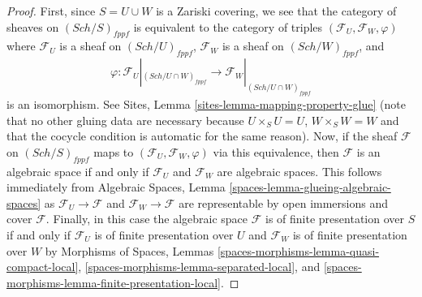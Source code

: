 \documentclass{stacks-project}
\theoremstyle{plain}
\theoremstyle{definition}
\theoremstyle{remark}
\numberwithin{equation}{subsection}
\def\Sch{\mathit{Sch}}
\begin{document}
\begin{proof}
First, since $S = U \cup W$ is a Zariski covering, we see that the
category of sheaves on $(\Sch/S)_{fppf}$ is equivalent to the category
of triples $(\mathcal{F}_U, \mathcal{F}_W, \varphi)$ where
$\mathcal{F}_U$ is a sheaf on $(\Sch/U)_{fppf}$,
$\mathcal{F}_W$ is a sheaf on $(\Sch/W)_{fppf}$, and
$$
\varphi :
\mathcal{F}_U|_{(\Sch/U \cap W)_{fppf}}
\longrightarrow
\mathcal{F}_W|_{(\Sch/U \cap W)_{fppf}}
$$
is an isomorphism. See Sites, Lemma \ref{sites-lemma-mapping-property-glue}
(note that no other gluing data are necessary because
$U \times_S U = U$, $W \times_S W = W$ and that the cocycle
condition is automatic for the same reason).
Now, if the sheaf $\mathcal{F}$ on $(\Sch/S)_{fppf}$
maps to $(\mathcal{F}_U, \mathcal{F}_W, \varphi)$
via this equivalence, then $\mathcal{F}$ is an algebraic space
if and only if $\mathcal{F}_U$ and $\mathcal{F}_W$ are algebraic spaces.
This follows immediately from
Algebraic Spaces, Lemma \ref{spaces-lemma-glueing-algebraic-spaces}
as $\mathcal{F}_U \to \mathcal{F}$ and $\mathcal{F}_W \to \mathcal{F}$
are representable by open immersions and cover $\mathcal{F}$.
Finally, in this case the algebraic space $\mathcal{F}$ is of finite
presentation over $S$ if and only if $\mathcal{F}_U$ is of finite presentation
over $U$ and $\mathcal{F}_W$ is of finite presentation over $W$
by Morphisms of Spaces, Lemmas
\ref{spaces-morphisms-lemma-quasi-compact-local},
\ref{spaces-morphisms-lemma-separated-local}, and
\ref{spaces-morphisms-lemma-finite-presentation-local}.
\end{proof}
\end{document}
